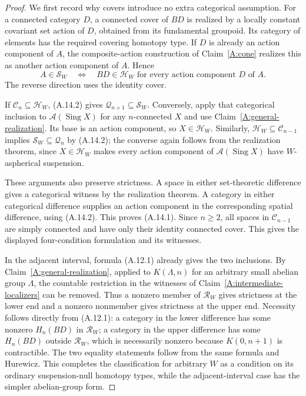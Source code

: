 \begin{proof}
We first record why covers introduce no extra categorical assumption. For a connected category $D$, a connected cover of $BD$ is realized by a locally constant covariant set action of $D$, obtained from its fundamental groupoid. Its category of elements has the required covering homotopy type. If $D$ is already an action component of $A$, the composite-action construction of Claim~\ref{A:cone} realizes this as another action component of $A$. Hence
\[
 A\in\mathcal S_W
 \quad\Longleftrightarrow\quad
 BD\in\mathscr H_W\text{ for every action component }D\text{ of }A.
 \tag{A.14.2}
\]
The reverse direction uses the identity cover.

If $\mathscr C_n\subseteq\mathscr H_W$, (A.14.2) gives $\mathcal Q_{n+1}\subseteq\mathcal S_W$. Conversely, apply that categorical inclusion to $\mathcal A(\operatorname{Sing}X)$ for any $n$-connected $X$ and use Claim~\ref{A:general-realization}. Its base is an action component, so $X\in\mathscr H_W$. Similarly, $\mathscr H_W\subseteq\mathscr C_{n-1}$ implies $\mathcal S_W\subseteq\mathcal Q_n$ by (A.14.2); the converse again follows from the realization theorem, since $X\in\mathscr H_W$ makes every action component of $\mathcal A(\operatorname{Sing}X)$ have $W$-aspherical suspension.

These arguments also preserve strictness. A space in either set-theoretic difference gives a categorical witness by the realization theorem. A category in either categorical difference supplies an action component in the corresponding spatial difference, using (A.14.2). This proves (A.14.1). Since $n\geq2$, all spaces in $\mathscr C_{n-1}$ are simply connected and have only their identity connected cover. This gives the displayed four-condition formulation and its witnesses.

In the adjacent interval, formula (A.12.1) already gives the two inclusions. By Claim~\ref{A:general-realization}, applied to $K(\Lambda,n)$ for an arbitrary small abelian group $\Lambda$, the countable restriction in the witnesses of Claim~\ref{A:intermediate-localizers} can be removed. Thus a nonzero member of $\mathcal R_W$ gives strictness at the lower end and a nonzero nonmember gives strictness at the upper end. Necessity follows directly from (A.12.1): a category in the lower difference has some nonzero $H_n(BD)$ in $\mathcal R_W$; a category in the upper difference has some $H_n(BD)$ outside $\mathcal R_W$, which is necessarily nonzero because $K(0,n+1)$ is contractible. The two equality statements follow from the same formula and Hurewicz. This completes the classification for arbitrary $W$ as a condition on its ordinary suspension-null homotopy types, while the adjacent-interval case has the simpler abelian-group form.
\end{proof}
